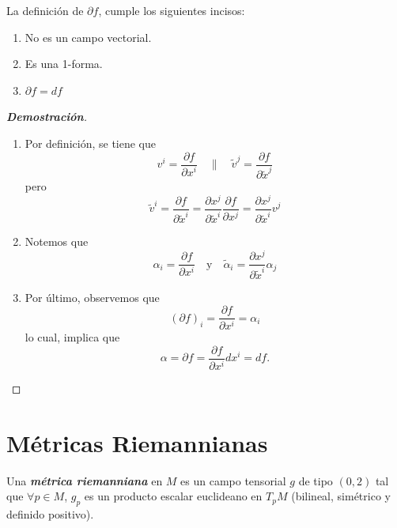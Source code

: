 \begin{theorem}
La definici\'on de $\partial f$, cumple los siguientes incisos:
\begin{enumerate}[label=(\alph*)]
    \item No es un campo vectorial.
    \item Es una 1-forma.
    \item $\partial f=df$
\end{enumerate}
\end{theorem}
\begin{proof}[\textbf{Demostraci\'on}]
\begin{enumerate}[label=(\alph*)]
    \item Por definici\'on, se tiene que 
    \begin{equation*}
        v^i=\frac{\partial f}{\partial x^i}\quad\|\quad\tilde{v}^j=\frac{\partial f}{\partial\tilde{x}^j}
    \end{equation*}
    pero 
    \begin{equation*}
        \tilde{v}^i=\frac{\partial f}{\partial\tilde{x}^i}=\frac{\partial x^j}{\partial\tilde{x}^i}\frac{\partial f}{\partial x^j}=\frac{\partial x^j}{\partial\tilde{x}^i}v^j
    \end{equation*}
    \item Notemos que
    \begin{equation*}
        \alpha_i=\frac{\partial f}{\partial x^i}\quad\text{y}\quad\tilde{\alpha}_i=\frac{\partial x^j}{\partial\tilde{x}^i}\alpha_j
    \end{equation*}
    \item Por \'ultimo, observemos que 
    \begin{equation*}
        (\partial f)_i=\frac{\partial f}{\partial x^i}=\alpha_i
    \end{equation*}
    lo cual, implica que
    \begin{equation*}
        \alpha=\partial f=\frac{\partial f}{\partial x^i}dx^i=df.
    \end{equation*}
\end{enumerate}    
\end{proof}

\section{M\'etricas Riemannianas}

\begin{definition}
Una \textit{\textbf{m\'etrica riemanniana}} en $M$ es un campo tensorial $g$ de tipo $(0,2)$ tal que $\forall p\in M$, $g_p$ 
es un producto escalar euclideano en $T_pM$ (bilineal, sim\'etrico y definido positivo).
\end{definition}

